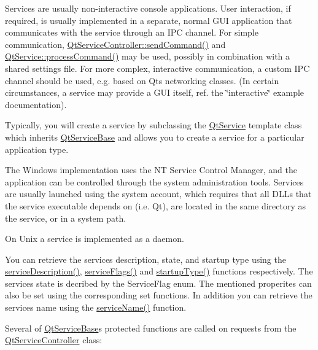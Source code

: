 Services are usually non-\/interactive console applications. User interaction, if required, is usually implemented in a separate, normal G\+UI application that communicates with the service through an I\+PC channel. For simple communication, \hyperlink{class_qt_service_controller_a1428c7d51403416bc7663ae37c446cfc}{Qt\+Service\+Controller\+::send\+Command()} and \hyperlink{class_qt_service_base_a47485f00f6eba0758d2ffc75092295cf}{Qt\+Service\+::process\+Command()} may be used, possibly in combination with a shared settings file. For more complex, interactive communication, a custom I\+PC channel should be used, e.\+g. based on Qt\textquotesingle{}s networking classes. (In certain circumstances, a service may provide a G\+UI itself, ref. the \char`\"{}interactive\char`\"{} example documentation).

Typically, you will create a service by subclassing the \hyperlink{class_qt_service}{Qt\+Service} template class which inherits \hyperlink{class_qt_service_base}{Qt\+Service\+Base} and allows you to create a service for a particular application type.

The Windows implementation uses the NT Service Control Manager, and the application can be controlled through the system administration tools. Services are usually launched using the system account, which requires that all D\+L\+Ls that the service executable depends on (i.\+e. Qt), are located in the same directory as the service, or in a system path.

On Unix a service is implemented as a daemon.

You can retrieve the service\textquotesingle{}s description, state, and startup type using the \hyperlink{class_qt_service_base_a6cf3ef7bc5d85acb31e99a85fde47397}{service\+Description()}, \hyperlink{class_qt_service_base_aab0b204981c481e098fe72061e3f367a}{service\+Flags()} and \hyperlink{class_qt_service_base_aa1b3bf9b7fc09777b422f49f7bcfbcbe}{startup\+Type()} functions respectively. The service\textquotesingle{}s state is decribed by the Service\+Flag enum. The mentioned properites can also be set using the corresponding set functions. In addition you can retrieve the service\textquotesingle{}s name using the \hyperlink{class_qt_service_base_a643f253b3931e6a6c4e8caa190756214}{service\+Name()} function.

Several of \hyperlink{class_qt_service_base}{Qt\+Service\+Base}\textquotesingle{}s protected functions are called on requests from the \hyperlink{class_qt_service_controller}{Qt\+Service\+Controller} class\+:

